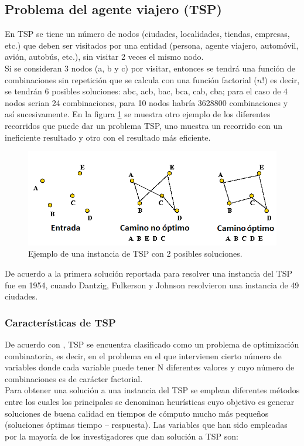 \subsection {Problema del agente viajero (TSP)}  
En TSP se tiene un número de nodos (ciudades, localidades, tiendas, empresas, etc.) que deben ser visitados por una entidad (persona, agente viajero, automóvil, avión, autobús, etc.), sin visitar 2 veces el mismo nodo. \\
\hspace*{1cm}Si se consideran 3 nodos (a, b y c) por visitar, entonces se tendrá una función de combinaciones sin repetición que se calcula con una función factorial ($n!$) es decir, se tendrán 6 posibles soluciones: abc, acb, bac, bca, cab, cba; para el caso de 4 nodos serian 24 combinaciones, para 10 nodos habría 3628800 combinaciones y así sucesivamente. En la figura \ref{fig:tsp1} se muestra otro ejemplo de los diferentes recorridos que puede dar un problema TSP, uno muestra un recorrido con un ineficiente resultado y otro con el resultado más eficiente.\\
    \begin{figure}[hbtp]
        \centering
            \includegraphics[width=1\textwidth]{MarcoTeorico/Imagenes/tsp1.png}
            \caption{Ejemplo de una instancia de TSP con 2 posibles soluciones.}                       
            \label{fig:tsp1}
    \end{figure} 
\hspace*{1cm}De acuerdo a \cite{[DANTZIG-RULKERSON]} la primera solución reportada para resolver una instancia del TSP fue en 1954, cuando Dantzig, Fulkerson y Johnson resolvieron una instancia de 49 ciudades.\\

\subsubsection{Características de TSP}
De acuerdo con \cite{[LENSTRA]}, TSP se encuentra clasificado como un problema de optimización combinatoria, es decir, en el problema en el que intervienen cierto número de variables donde cada variable puede tener N diferentes valores y cuyo número de combinaciones es de carácter factorial.\\
\hspace*{1cm}Para obtener una solución a una instancia del TSP se emplean diferentes métodos entre los cuales los principales se denominan heurísticas cuyo objetivo es generar soluciones de buena calidad en tiempos de cómputo mucho más pequeños (soluciones óptimas tiempo – respuesta). Las variables que han sido empleadas por la mayoría de los investigadores que dan solución a TSP son:

